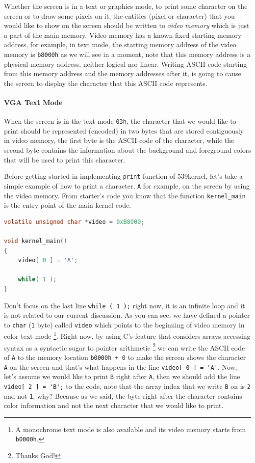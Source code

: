 Whether the screen is in a text or graphics mode, to print some
character on the screen or to draw some pixels on it, the entities
(pixel or character) that you would like to show on the screen should be
written to \emph{video memory} which is just a part of the main memory.
Video memory has a known fixed starting memory address, for example, in
text mode, the starting memory address of the video memory is
\lstinline!b8000h! as we will see in a moment, note that this memory
address is a physical memory address, neither logical nor linear.
Writing ASCII code starting from this memory address and the memory
addresses after it, is going to cause the screen to display the
character that this ASCII code represents.

\paragraph{VGA Text Mode}\label{vga-text-mode}

When the screen is in the text mode \lstinline!03h!, the character that
we would like to print should be represented (encoded) in two bytes that
are stored contiguously in video memory, the first byte is the ASCII
code of the character, while the second byte contains the information
about the background and foreground colors that will be used to print
this character.

Before getting started in implementing \lstinline!print! function of
539kernel, let's take a simple example of how to print a character,
\lstinline!A! for example, on the screen by using the video memory. From
starter's code you know that the function \lstinline!kernel_main! is the
entry point of the main kernel code.

\begin{lstlisting}[language=C]
volatile unsigned char *video = 0xB8000;

void kernel_main()
{
    video[ 0 ] = 'A';
    
    while( 1 );
}
\end{lstlisting}

Don't focus on the last line \lstinline!while ( 1 );! right now, it is
an infinite loop and it is not related to our current discussion. As you
can see, we have defined a pointer to \lstinline!char! (\lstinline!1!
byte) called \lstinline!video! which points to the beginning of video
memory in color text mode \footnote{A monochrome text mode is also
  available and its video memory starts from \lstinline!b0000h!.}. Right
now, by using C's feature that considers arrays accessing syntax as a
syntactic sugar to pointer arithmetic \footnote{Thanks God!} we can
write the ASCII code of \lstinline!A! to the memory location
\lstinline!b0000h + 0! to make the screen shows the character
\lstinline!A! on the screen and that's what happens in the line
\lstinline!video[ 0 ] = 'A'!. Now, let's assume we would like to print
\lstinline!B! right after \lstinline!A!, then we should add the line
\lstinline!video[ 2 ] = 'B';! to the code, note that the array index
that we write \lstinline!B! on is \lstinline!2! and not \lstinline!1!,
why? Because as we said, the byte right after the character contains
color information and not the next character that we would like to
print.

